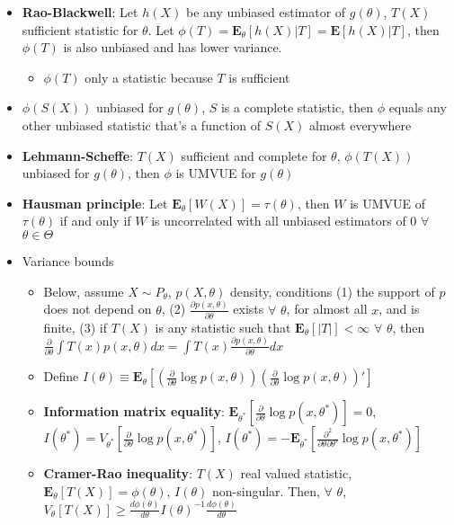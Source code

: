 \documentclass[12pt,english]{article}
\begin{document}
\begin{itemize}
\begin{itemize}
\begin{itemize}
		\end{itemize}
		\item \textbf{Rao-Blackwell}: Let $h(X)$ be any unbiased estimator of $g(\theta)$, $T(X)$ sufficient statistic for $\theta$. Let $\phi(T) = \mathbf{E}_{\theta}[h(X) | T] = \mathbf{E}[h(X) | T]$, then $\phi(T)$ is also unbiased and has lower variance.
		\begin{itemize}
			\item $\phi(T)$ only a statistic because $T$ is sufficient
		\end{itemize}
		\item $\phi(S(X))$ unbiased for $g(\theta)$, $S$ is a complete statistic, then $\phi$ equals any other unbiased statistic that's a function of $S(X)$ almost everywhere
		\item \textbf{Lehmann-Scheffe}: $T(X)$ sufficient and complete for $\theta$, $\phi(T(X))$ unbiased for $g(\theta)$, then $\phi$ is UMVUE for $g(\theta)$
		\item \textbf{Hausman principle}: Let $\mathbf{E}_{\theta}[W(X)] = \tau(\theta)$, then $W$ is UMVUE of $\tau(\theta)$ if and only if $W$ is uncorrelated with all unbiased estimators of 0 $\forall$ $\theta \in \Theta$
		\item Variance bounds
		\begin{itemize}
			\item Below, assume $X \sim P_{\theta}$, $p(X, \theta)$ density, conditions (1) the support of $p$ does not depend on $\theta$, (2) $\frac{\partial p(x, \theta)}{\partial \theta}$ exists $\forall$ $\theta$, for almost all $x$, and is finite, (3) if $T(X)$ is any statistic such that $\mathbf{E}_{\theta}[|T|] < \infty$ $\forall$ $\theta$, then $\frac{\partial}{\partial \theta} \int T(x) p(x, \theta) dx = \int T(x) \frac{\partial p(x, \theta)}{\partial \theta} dx$
			\item Define $I(\theta) \equiv \mathbf{E}_{\theta} \left[ \left(\frac{\partial}{\partial \theta} \log p(x, \theta) \right) \left(\frac{\partial}{\partial \theta} \log p(x, \theta) \right)' \right]$
			\item \textbf{Information matrix equality}: $\mathbf{E}_{\theta^{*}}[\frac{\partial}{\partial \theta} \log p(x, \theta^{*})] = 0$,\\ $I(\theta^{*}) = V_{\theta^{*}}[\frac{\partial}{\partial \theta} \log p(x, \theta^{*})]$, $I(\theta^{*}) = -\mathbf{E}_{\theta^{*}}[\frac{\partial^{2}}{\partial \theta \partial \theta'} \log p(x, \theta^{*})]$
			\item \textbf{Cramer-Rao inequality}: $T(X)$ real valued statistic, $\mathbf{E}_{\theta}[T(X)] = \phi(\theta)$, $I(\theta)$ non-singular. Then, $\forall$ $\theta$, $V_{\theta}[T(X)] \geq \frac{d \phi(\theta)}{d\theta} I(\theta)^{-1} \frac{d \phi(\theta)}{d\theta}$

\end{itemize}
\end{itemize}
\end{itemize}
\end{document}
